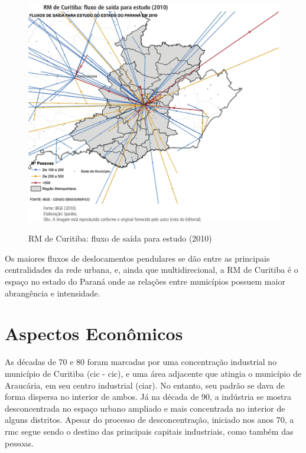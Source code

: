 	\begin{figure}
		\centering
		\caption{RM de Curitiba: fluxo de saída para estudo (2010)}
		\includegraphics[width=1.0\linewidth]{img/costa2015a_08}
		\label{fig:costa2015a_08}
	\end{figure}
	
	Os maiores fluxos de deslocamentos pendulares se dão entre as principais centralidades da rede urbana, e, ainda que multidirecional, a RM de Curitiba é o espaço no estado do Paraná onde as relações entre municípios possuem maior abrangência e intensidade.
	
	\section{Aspectos Econômicos}
	
	As décadas de 70 e 80 foram marcadas por uma concentração industrial no município de Curitiba (\glsdesc{cic} - \gls{cic}), e uma área adjacente que atingia o município de Araucária, em seu centro industrial (\gls{ciar}). No entanto, seu padrão se dava de forma dispersa no interior de ambos. Já na década de 90, a indústria se mostra desconcentrada no espaço urbano ampliado e mais concentrada no interior de alguns distritos. Apesar do processo de desconcentração, iniciado nos anos 70, a \gls{rmc} segue sendo o destino das principais capitais industriais, como também das pessoas. 
	

